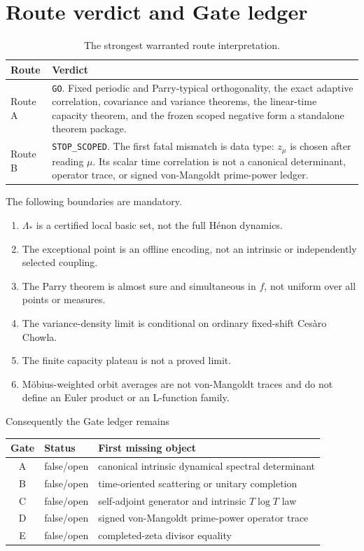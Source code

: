 \documentclass[11pt,a4paper]{article}
\theoremstyle{remark}
\newcommand{\Mob}{\mu}
\newcommand{\Lam}{\Lambda_*}
\begin{document}
\section{Route verdict and Gate ledger}

\begin{table}[ht]
\centering
\small
\caption{The strongest warranted route interpretation.}
\label{tab:route}
\begin{tabular}{@{}p{}p{}@{}}
\toprule
Route & Verdict\\
\midrule
Route A & \texttt{GO}.  Fixed periodic and Parry-typical orthogonality,
the exact adaptive correlation, covariance and variance theorems, the
linear-time capacity theorem, and the frozen scoped negative form a
standalone theorem package.\\
Route B & \texttt{STOP\_SCOPED}.  The first fatal mismatch is data type:
$z_{\Mob}$ is chosen after reading $\Mob$.  Its scalar time correlation is
not a canonical determinant, operator trace, or signed von-Mangoldt
prime-power ledger.\\
\bottomrule
\end{tabular}
\end{table}

The following boundaries are mandatory.
\begin{enumerate}[leftmargin=2em]
 \item $\Lam$ is a certified local basic set, not the full H\'enon dynamics.
 \item The exceptional point is an offline encoding, not an intrinsic or
       independently selected coupling.
 \item The Parry theorem is almost sure and simultaneous in $f$, not uniform
       over all points or measures.
 \item The variance-density limit is conditional on ordinary fixed-shift
       Ces\`aro Chowla.
 \item The finite capacity plateau is not a proved limit.
 \item M\"obius-weighted orbit averages are not von-Mangoldt traces and do
       not define an Euler product or an L-function family.
\end{enumerate}

Consequently the Gate ledger remains
\begin{center}
\begin{tabular}{@{}cll@{}}
\toprule
Gate & Status & First missing object\\
\midrule
A & false/open & canonical intrinsic dynamical spectral determinant\\
B & false/open & time-oriented scattering or unitary completion\\
C & false/open & self-adjoint generator and intrinsic $T\log T$ law\\
D & false/open & signed von-Mangoldt prime-power operator trace\\
E & false/open & completed-zeta divisor equality\\
\bottomrule
\end{tabular}
\end{center}
\end{document}
